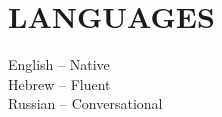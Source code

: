 \documentclass[margin]{res}
\begin{document}
\begin{resume}
\begin{itemize}
\end{itemize}

\section{LANGUAGES}
English -- Native \\
Hebrew -- Fluent \\
Russian -- Conversational            

\end{resume}
\end{document}
